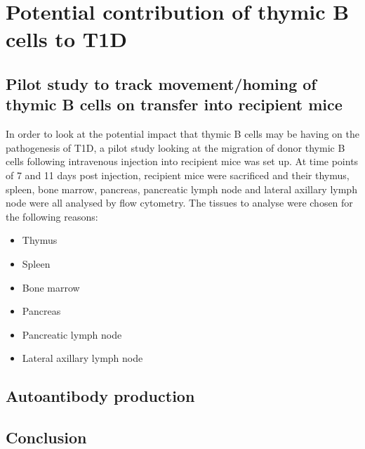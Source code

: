 \section{Potential contribution of thymic B cells to T1D}

\subsection{Pilot study to track movement/homing of thymic B cells on transfer into recipient mice}
In order to look at the potential impact that thymic B cells may be having on the pathogenesis of T1D, a pilot study looking at the migration of donor thymic B cells following intravenous injection into recipient mice was set up. 
At time points of 7 and 11 days post injection, recipient mice were sacrificed and their thymus, spleen, bone marrow, pancreas, pancreatic lymph node and lateral axillary lymph node were all analysed by flow cytometry.
The tissues to analyse were chosen for the following reasons:
\begin{itemize}
\item Thymus
\item Spleen
\item Bone marrow
\item Pancreas
\item Pancreatic lymph node
\item Lateral axillary lymph node
\end{itemize}

\subsection{Autoantibody production}

\subsection{Conclusion}

